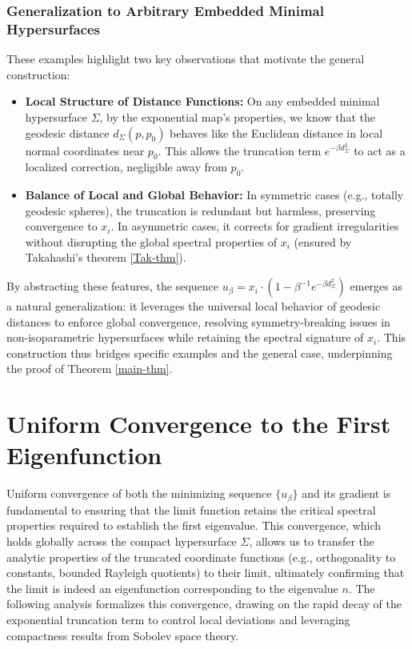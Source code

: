 \documentclass[a4, 12pt]{amsart}
\numberwithin{equation}{section} \numberwithin{equation}{section}
\begin{document}
\subsubsection{Generalization to Arbitrary Embedded Minimal Hypersurfaces}
These examples highlight two key observations that motivate the general construction:
\begin{itemize}
\item[(i)] \textbf{Local Structure of Distance Functions:} On any embedded minimal hypersurface $\Sigma$, by the exponential map's properties, we know that the geodesic distance $d_\Sigma(p, p_0)$ behaves like the Euclidean distance in local normal coordinates near $p_0$. This allows the truncation term $e^{-\beta d_\Sigma^2}$ to act as a localized correction, negligible away from $p_0$.
\item[(ii)] \textbf{Balance of Local and Global Behavior:} In symmetric cases (e.g., totally geodesic spheres), the truncation is redundant but harmless, preserving convergence to $x_i$. In asymmetric cases, it corrects for gradient irregularities without disrupting the global spectral properties of $x_i$ (ensured by Takahashi's theorem \ref{Tak-thm}).
\end{itemize}
By abstracting these features, the sequence $u_\beta = x_i \cdot \left(1 - \beta^{-1}e^{-\beta d_\Sigma^2}\right)$ emerges as a natural generalization: it leverages the universal local behavior of geodesic distances to enforce global convergence, resolving symmetry-breaking issues in non-isoparametric hypersurfaces while retaining the spectral signature of $x_i$. This construction thus bridges specific examples and the general case, underpinning the proof of Theorem \ref{main-thm}.



\section{Uniform Convergence to the First Eigenfunction}\label{section: Uniform Convergence}
Uniform convergence of both the minimizing sequence $ \{u_\beta\} $ and its gradient is fundamental to ensuring that the limit function retains the critical spectral properties required to establish the first eigenvalue. This convergence, which holds globally across the compact hypersurface $ \Sigma $, allows us to transfer the analytic properties of the truncated coordinate functions (e.g., orthogonality to constants, bounded Rayleigh quotients) to their limit, ultimately confirming that the limit is indeed an eigenfunction corresponding to the eigenvalue $ n $. The following analysis formalizes this convergence, drawing on the rapid decay of the exponential truncation term to control local deviations and leveraging compactness results from Sobolev space theory.
\end{document}
